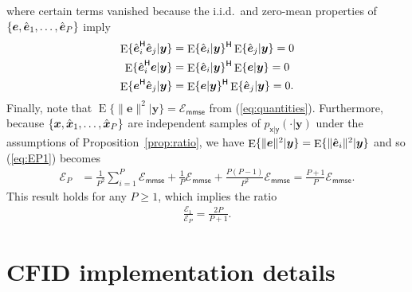 \documentclass{article}
\theoremstyle{plain}
\theoremstyle{definition}
\theoremstyle{remark}
\newcommand{\hvec}[1]{\ensuremath{\Hat{\boldsymbol{#1}}}}
\renewcommand{\vec}[1]{\ensuremath{\boldsymbol{#1}}}
\newcommand{\mc}[1]{\ensuremath{\mathcal{#1}}}
\newcommand{\herm}{^{\textsf{H}}}
\DeclareMathOperator{\E}{E}
\renewcommand{\eqref}[1]{(\ref{eq:#1})}
\newcommand{\propref}[1]{Proposition~\ref{prop:#1}}
\newcommand{\mmse}{_{\mathsf{mmse}}}
\newcommand{\pxgy}{p_{\mathsf{x}|\mathsf{y}}}
\begin{document}
where certain terms vanished because the i.i.d.\ and zero-mean properties of $\{\vec{e},\hvec{e}_1,\dots,\hvec{e}_P\}$ imply
\begin{align}
\E\{\hvec{e}_i\herm\hvec{e}_j|\vec{y}\}
&=\E\{\hvec{e}_i|\vec{y}\}\herm\E\{\hvec{e}_j|\vec{y}\} = 0\\
\E\{\hvec{e}_i\herm\vec{e}|\vec{y}\}
&=\E\{\hvec{e}_i|\vec{y}\}\herm\E\{\vec{e}|\vec{y}\} = 0\\
\E\{\vec{e}\herm\hvec{e}_j|\vec{y}\}
&=\E\{\vec{e}|\vec{y}\}\herm\E\{\hvec{e}_j|\vec{y}\} = 0 .
\end{align}
Finally, note that
$\E\{\|\vec{e}\|^2|\vec{y}\}=\mc{E}\mmse$ from \eqref{quantities}.
Furthermore, because $\{\vec{x},\hvec{x}_1,\dots,\hvec{x}_P\}$ are independent samples of $\pxgy(\cdot|\vec{y})$ under the assumptions of \propref{ratio}, we have $\E\{\|\vec{e}\|^2|\vec{y}\}=\E\{\|\hvec{e}_i\|^2|\vec{y}\}$ and so \eqref{EP1} becomes
\begin{align}
\mc{E}_P 
&= \frac{1}{P^2}\sum_{i=1}^P \mc{E}\mmse
    +\frac{1}{P} \mc{E}\mmse 
    + \frac{P(P-1)}{P^2} \mc{E}\mmse 
= \frac{P+1}{P} \mc{E}\mmse .
\end{align}
This result holds for any $P\geq 1$, which implies the ratio
\begin{align}
\frac{\mc{E}_1}{\mc{E}_P} = \frac{2P}{P+1} .
\end{align}

\section{CFID implementation details} \label{app:cfid}
\setcounter{table}{0}
\renewcommand\thetable{\thesection.\arabic{table}}
\end{document}
